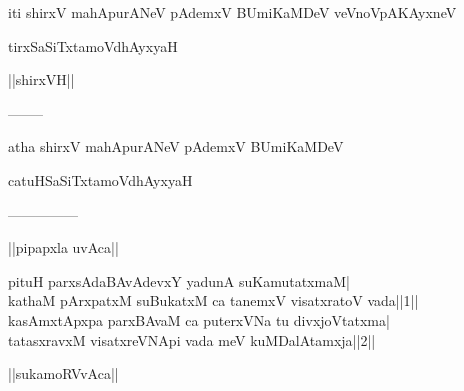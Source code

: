 \documentclass{article}
\begin{document}
\begin{center}
iti shirxV mahApurANeV pAdemxV BUmiKaMDeV veVnoVpAKAyxneV
\end{center}

\begin{center}
tirxSaSiTxtamoVdhAyxyaH
\end{center}

\begin{center}
||shirxVH||
\end{center}

\begin{center}
--------
\end{center}

\begin{center}
atha shirxV mahApurANeV pAdemxV BUmiKaMDeV
\end{center}

\begin{center}
catuHSaSiTxtamoVdhAyxyaH
\end{center}

\begin{center}

---------------
\end{center}

\begin{center}
||pipapxla uvAca||
\end{center}

pituH parxsAdaBAvAdevxY yadunA suKamutatxmaM|\\
kathaM pArxpatxM suBukatxM ca tanemxV visatxratoV vada||1||\\
kasAmxtApxpa parxBAvaM ca puterxVNa tu divxjoVtatxma|\\
tatasxravxM visatxreVNApi vada meV kuMDalAtamxja||2||\\

\begin{center}
||sukamoRVvAca||
\end{center}
\end{document}

